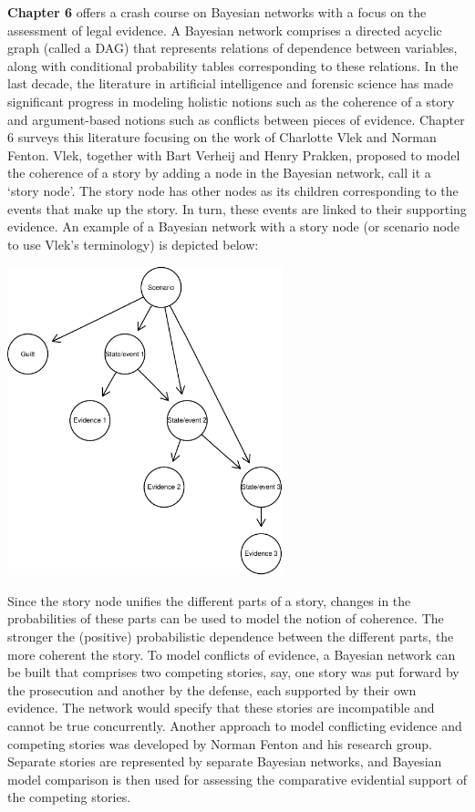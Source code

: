 \documentclass[10pt,dvipsnames,enabledeprecatedfontcommands]{scrartcl}
\begin{document}
\textbf{Chapter 6} offers a crash course on Bayesian networks with a
focus on the assessment of legal evidence. A Bayesian network comprises
a directed acyclic graph (called a DAG) that represents relations of
dependence between variables, along with conditional probability tables
corresponding to these relations. In the last decade, the literature in
artificial intelligence and forensic science has made significant
progress in modeling holistic notions such as the coherence of a story
and argument-based notions such as conflicts between pieces of evidence.
Chapter 6 surveys this literature focusing on the work of Charlotte Vlek
and Norman Fenton. Vlek, together with Bart Verheij and Henry Prakken,
proposed to model the coherence of a story by adding a node in the
Bayesian network, call it a `story node'. The story node has other nodes
as its children corresponding to the events that make up the story. In
turn, these events are linked to their supporting evidence. An example
of a Bayesian network with a story node (or scenario node to use Vlek's
terminology) is depicted below:

\begin{center}
\includegraphics[width=8cm]{vlek-scenario-node.pdf}
 \end{center}

Since the story node unifies the different parts of a story, changes in
the probabilities of these parts can be used to model the notion of
coherence. The stronger the (positive) probabilistic dependence between
the different parts, the more coherent the story. To model conflicts of
evidence, a Bayesian network can be built that comprises two competing
stories, say, one story was put forward by the prosecution and another
by the defense, each supported by their own evidence. The network would
specify that these stories are incompatible and cannot be true
concurrently. Another approach to model conflicting evidence and
competing stories was developed by Norman Fenton and his research group.
Separate stories are represented by separate Bayesian networks, and
Bayesian model comparison is then used for assessing the comparative
evidential support of the competing stories.
\end{document}
